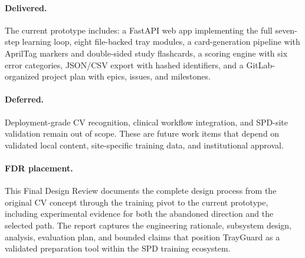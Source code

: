 \documentclass[10pt]{article}
\begin{document}
\paragraph{Delivered.}
The current prototype includes: a FastAPI web app implementing the full
seven-step learning loop, eight file-backed tray modules, a card-generation
pipeline with AprilTag markers and double-sided study flashcards, a scoring
engine with six error categories, JSON/CSV export with hashed identifiers, and
a GitLab-organized project plan with epics, issues, and milestones.

\paragraph{Deferred.}
Deployment-grade CV recognition, clinical workflow integration, and SPD-site
validation remain out of scope. These are future work items that depend on
validated local content, site-specific training data, and institutional
approval.

\paragraph{FDR placement.}
This Final Design Review documents the complete design process from the
original CV concept through the training pivot to the current prototype,
including experimental evidence for both the abandoned direction and the
selected path. The report captures the engineering rationale, subsystem design,
analysis, evaluation plan, and bounded claims that position TrayGuard as a
validated preparation tool within the SPD training ecosystem.
\end{document}
